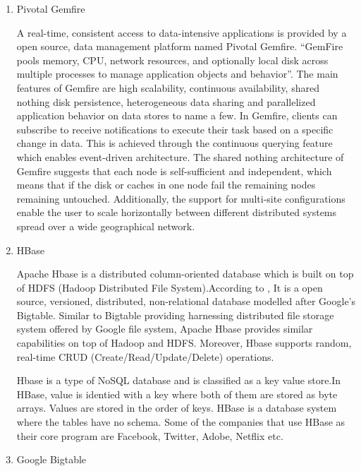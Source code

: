 \begin{enumerate}
\item {} 
Pivotal Gemfire \label{\detokenize{i524/technologies:id431}}{\hyperref[\detokenize{i524/technologies:www-gemfire}]{\sphinxcrossref{{[}370{]}}}}

A real-time, consistent access to data-intensive applications is
provided by a open source, data management platform named Pivotal
Gemfire. ``GemFire pools memory, CPU, network resources, and
optionally local disk across multiple processes to manage
application objects and behavior''. The main features of Gemfire
are high scalability, continuous availability, shared nothing
disk persistence, heterogeneous data sharing and parallelized
application behavior on data stores to name a few.  In Gemfire,
clients can subscribe to receive notifications to execute their
task based on a specific change in data. This is achieved through
the continuous querying feature which enables event-driven
architecture. The shared nothing architecture of Gemfire suggests
that each node is self-sufficient and independent, which means
that if the disk or caches in one node fail the remaining nodes
remaining untouched. Additionally, the support for multi-site
configurations enable the user to scale horizontally between
different distributed systems spread over a wide geographical
network.

\item {} 
HBase

Apache Hbase is a distributed column-oriented database
which is built on top of HDFS (Hadoop Distributed File
System).According to \label{\detokenize{i524/technologies:id432}}{\hyperref[\detokenize{i524/technologies:www-hbase}]{\sphinxcrossref{{[}371{]}}}}, It is a open source,
versioned, distributed, non-relational database modelled after
Google’s Bigtable. Similar to Bigtable providing harnessing
distributed file storage system offered by Google file system,
Apache Hbase provides similar capabilities on top of Hadoop and
HDFS. Moreover, Hbase supports random, real-time CRUD
(Create/Read/Update/Delete) operations.

Hbase is a type of NoSQL database and is classified as a key
value store.In HBase, value is identied with a key where both of
them are stored as byte arrays. Values are stored in the order of
keys. HBase is a database system where the tables have no
schema. Some of the companies that use HBase as their core
program are Facebook, Twitter, Adobe, Netflix etc.

\item {} 
Google Bigtable


\end{enumerate}
